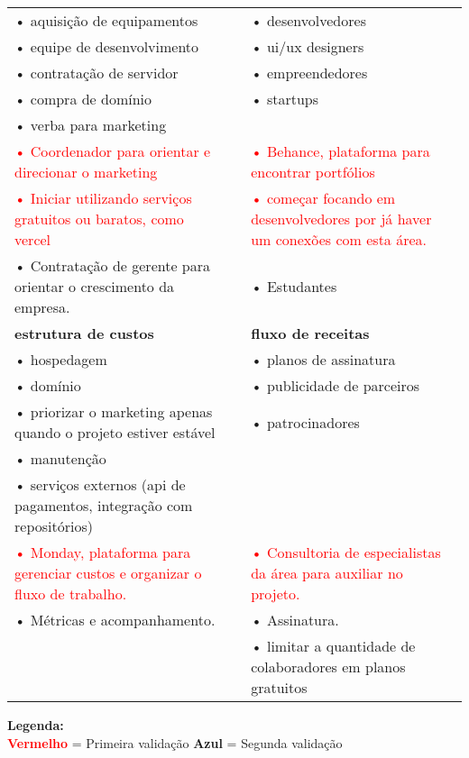 \documentclass{article}
\begin{document}
\begin{table}[H]
\begin{tabular}{|p{6cm}|p{6cm}|p{6cm}|}
\cline{1-1}\cline{2-2}\cline{3-3}
• aquisição de equipamentos & & • desenvolvedores \\
• equipe de desenvolvimento & & • ui/ux designers \\
• contratação de servidor & & • empreendedores \\
• compra de domínio & & • startups \\
• verba para marketing & & \\
\textcolor{red}{• Coordenador para orientar e direcionar o marketing} &
& 
\textcolor{red}{• Behance, plataforma para encontrar portfólios} \\
\textcolor{red}{• Iniciar utilizando serviços gratuitos ou baratos, como vercel} &
& 
\textcolor{red}{• começar focando em desenvolvedores por já haver um conexões com esta área.} \\
\textcolor{blueval}{• Contratação de gerente para orientar o crescimento da empresa.} &
& 
\textcolor{blueval}{• Estudantes} \\
\hline
\rowcolor{lightgray}
\textbf{estrutura de custos} & & \textbf{fluxo de receitas} \\
\hline
• hospedagem & & • planos de assinatura \\
• domínio & & • publicidade de parceiros \\
• \textcolor{blueval}{priorizar o} marketing \textcolor{blueval}{apenas quando o projeto estiver estável} & & • patrocinadores \\
• manutenção & & \\
• serviços externos (api de pagamentos, integração com repositórios) & & \\
\textcolor{red}{• Monday, plataforma para gerenciar custos e organizar o fluxo de trabalho.} &
&
\textcolor{red}{• Consultoria de especialistas da área para auxiliar no projeto.} \\
\textcolor{blueval}{• Métricas e acompanhamento.} &
&
\textcolor{blueval}{• Assinatura.} \\
& & \textcolor{blueval}{• limitar a quantidade de colaboradores em planos gratuitos}  \\
\hline
\end{tabular}

\begin{center}
\textbf{Legenda:} \\
\textcolor{red}{\textbf{Vermelho}} = Primeira validação
\textcolor{blueval}{\textbf{Azul}} = Segunda validação
\end{center}

\end{table}
\end{document}
